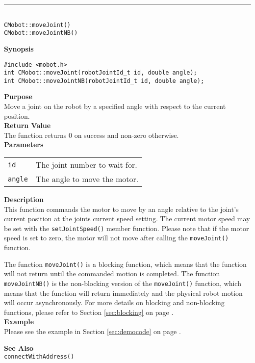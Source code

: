 \noindent
\vspace{5pt}
\rule{4.5in}{0.015in}\\
\noindent
{\LARGE \texttt{CMobot::moveJoint()}}\\
{\LARGE \texttt{CMobot::moveJointNB()}}\\
{}

\noindent
{\bf Synopsis}
\vspace{-8pt}
\begin{verbatim}
#include <mobot.h>
int CMobot::moveJoint(robotJointId_t id, double angle);
int CMobot::moveJointNB(robotJointId_t id, double angle);
\end{verbatim}

\noindent
{\bf Purpose}\\
Move a joint on the robot by a specified angle with respect to the current position.\\

\noindent
{\bf Return Value}\\
The function returns 0 on success and non-zero otherwise.\\

\noindent
{\bf Parameters}\\
\vspace{-0.1in}
\begin{description}
\item               
\begin{tabular}{p{10 mm}p{145 mm}}
\texttt{id} & The joint number to wait for. \\
\texttt{angle} & The angle to move the motor.  \\
\end{tabular}
\end{description}

\noindent
{\bf Description}\\
This function commands the motor to move by an angle relative to the
joint's current position at the joints current speed setting.
The current motor speed may be set with the
\texttt{setJointSpeed()} member function. Please note that if the motor speed
is set to zero, the motor will not move after calling the
\texttt{moveJoint()} function. 

The function \texttt{moveJoint()} is a blocking function, which means that 
the function will not return until the commanded motion is 
completed. The function \texttt{moveJointNB()} is the non-blocking version of
the \texttt{moveJoint()} function, which means that the function will return
immediately and the physical robot motion will occur asynchronously. For
more details on blocking and non-blocking functions, please refer to 
Section \ref{sec:blocking} on page \pageref{sec:blocking}.\\

\noindent
{\bf Example}\\
Please see the example in Section \ref{sec:democode} on page \pageref{sec:democode}.\\
\noindent

\noindent
{\bf See Also}\\
\texttt{connectWithAddress()}

